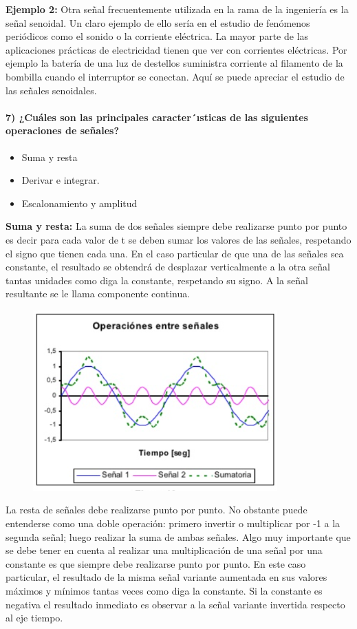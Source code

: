 \textbf{Ejemplo 2:}
Otra señal frecuentemente utilizada en la rama de la ingeniería es la señal senoidal.  Un claro ejemplo de ello sería en el estudio de fenómenos periódicos como el sonido o la corriente eléctrica. La mayor parte de las aplicaciones prácticas de electricidad tienen que ver con corrientes eléctricas. Por ejemplo la batería de una luz de destellos suministra corriente al filamento de la bombilla cuando el interruptor se conectan. Aquí se puede apreciar el estudio de las señales senoidales.\\

\paragraph{7) ¿Cuáles son las principales caracter´ısticas de las siguientes operaciones de señales? }

\begin{itemize}
	\item Suma y resta
	\item Derivar e integrar.
	\item Escalonamiento y amplitud
\end{itemize}

\textbf{Suma y resta:}
La suma de dos señales siempre debe realizarse punto por punto es decir para cada valor de t se deben sumar los valores de las señales, respetando el signo que tienen cada una. En el caso particular de que una de las señales sea constante, el resultado se obtendrá de desplazar verticalmente a la otra señal tantas unidades como diga la constante, respetando su signo. A la señal resultante se le llama componente continua.
\begin{figure}[h]
	\includegraphics[scale=0.6]{S}
	\label{fig:1}
	\centering
\end{figure}

La resta de señales debe realizarse punto por punto. No obstante puede entenderse como una doble operación: primero invertir o multiplicar por -1 a la segunda señal; luego realizar la suma de ambas señales. Algo muy importante que se debe tener en cuenta al realizar una multiplicación de una señal por una constante es que siempre debe realizarse punto por punto. En este caso particular, el resultado de la misma señal variante aumentada en sus valores máximos y mínimos tantas veces como diga la constante. Si la constante es negativa el resultado inmediato es observar a la señal variante invertida respecto al eje tiempo.

